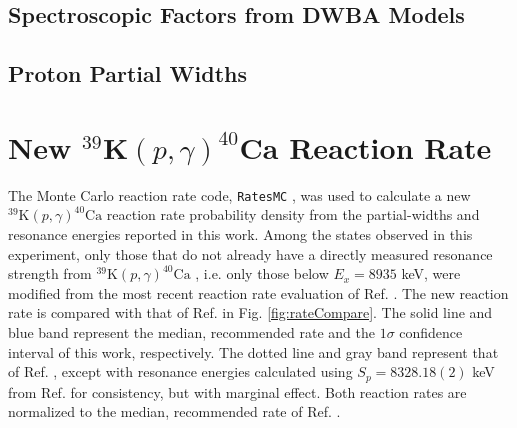 
\subsection{Spectroscopic Factors from DWBA Models}



\subsection{Proton Partial Widths}



\section{New $^{39}\mathrm{\textbf{K}}(p,\gamma)^{40}\mathrm{\textbf{Ca}}$ Reaction Rate}

The Monte Carlo reaction rate code, \texttt{RatesMC} \cite{Longland2010a,RatesMC}, was used to calculate a new $^{39}\mathrm{K}(p, \gamma)^{40}\mathrm{Ca}$ reaction rate probability density from the partial-widths and resonance energies reported in this work. Among the states observed in this experiment, only those that do not already have a directly measured resonance strength from $^{39}\mathrm{K}(p, \gamma)^{40}\mathrm{Ca}$ \cite{Kikstra1990,Cheng1981,Leenhouts1966}, i.e. only those below $E_{x} = 8935$ keV, were modified from the most recent reaction rate evaluation of Ref. \cite{Longland2018}. 
The new reaction rate is compared with that of Ref. \cite{Longland2018} in Fig. \ref{fig:rateCompare}. The solid line and blue band represent the median, recommended rate and the $1\sigma$ confidence interval of this work, respectively. The dotted line and gray band represent that of Ref. \cite{Longland2018}, except with resonance energies calculated using $S_{p} = 8328.18(2)$ keV from Ref. \cite{Wang2021} for consistency, but with marginal effect. Both reaction rates are normalized to the median, recommended rate of Ref. \cite{Longland2018}. %

